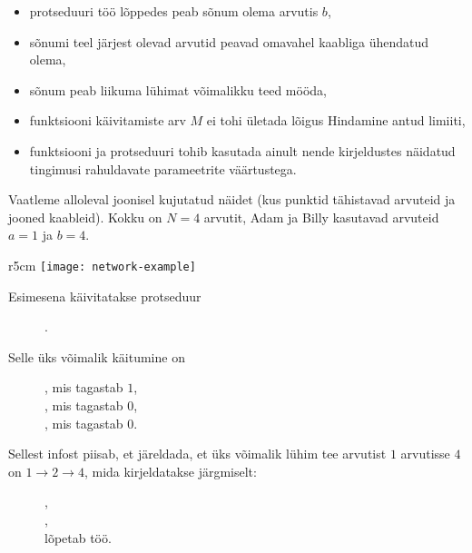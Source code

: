 \documentclass{boi2014-et}
\begin{document}
    \begin{itemize}
        \item protseduuri  töö lõppedes peab sõnum olema
            arvutis $b$,
        \item sõnumi teel järjest olevad arvutid peavad omavahel kaabliga
            ühendatud olema,
        \item sõnum peab liikuma lühimat võimalikku teed mööda,
        \item funktsiooni  käivitamiste arv $M$ ei tohi ületada
            lõigus Hindamine antud limiiti,
        \item funktsiooni  ja protseduuri 
            tohib kasutada ainult nende kirjeldustes näidatud tingimusi
            rahuldavate parameetrite väärtustega.
    \end{itemize}

    \Example

    Vaatleme alloleval joonisel kujutatud näidet (kus punktid tähistavad
    arvuteid ja jooned kaableid). Kokku on $N = 4$ arvutit, Adam ja Billy
    kasutavad arvuteid $a = 1$ ja $b = 4$.

    \begin{wrapfigure}[1]{r}{5cm}
        \texttt{[image: network-example]}
    \end{wrapfigure}

    Esimesena käivitatakse protseduur
    \begin{figure}[H]
        \centering
        .
    \end{figure}

    Selle üks võimalik käitumine on
    \begin{figure}[H]
        \centering
        , mis tagastab $1$, \\
        , mis tagastab $0$, \\
        , mis tagastab $0$.
    \end{figure}

    Sellest infost piisab, et järeldada, et üks võimalik lühim tee arvutist
    $1$ arvutisse $4$ on $1 \to 2 \to 4$, mida kirjeldatakse järgmiselt:
    \begin{figure}[H]
        \centering
        , \\
        , \\
         lõpetab töö.
    \end{figure}
\end{document}
